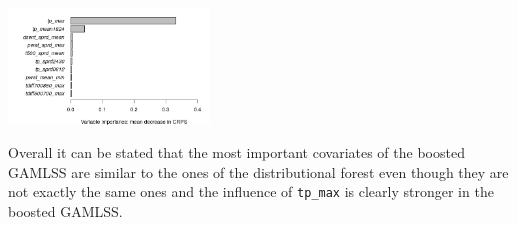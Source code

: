 \documentclass[american,foldmarks=false,noconfig]{uibklttr}
\begin{document}
\begin{center}
\includegraphics[width = 0.4\textwidth]{varimp_gb.jpeg}
\end{center}

Overall it can be stated that the most important covariates of the boosted 
GAMLSS are similar to the ones of the distributional forest even though they
are not exactly the same ones and the influence of \texttt{tp\_max} is clearly
stronger in the boosted GAMLSS.



\end{document}
